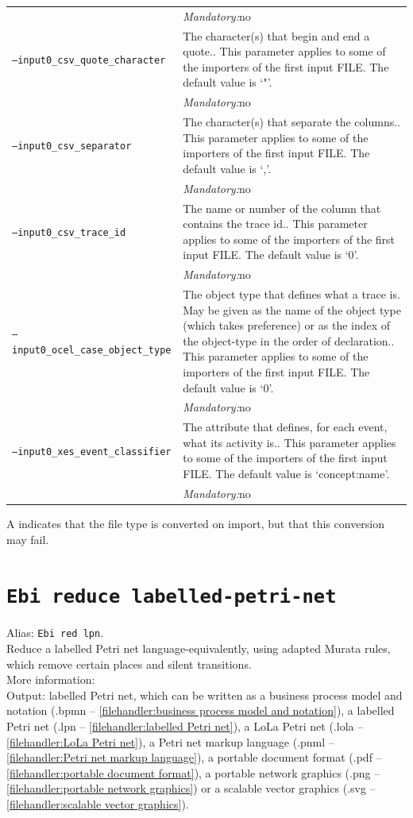 {\begin{tabularx}{\linewidth}{lX}
&\textit{Mandatory:}\quad no\\
\texttt{--input0\_csv\_quote\_character} & The character(s) that begin and end a quote.. This parameter applies to some of the importers of the first input FILE. The default value is `"'.\\
&\textit{Mandatory:}\quad no\\
\texttt{--input0\_csv\_separator} & The character(s) that separate the columns.. This parameter applies to some of the importers of the first input FILE. The default value is `,'.\\
&\textit{Mandatory:}\quad no\\
\texttt{--input0\_csv\_trace\_id} & The name or number of the column that contains the trace id.. This parameter applies to some of the importers of the first input FILE. The default value is `0'.\\
&\textit{Mandatory:}\quad no\\
\texttt{--input0\_ocel\_case\_object\_type} & The object type that defines what a trace is. May be given as the name of the object type (which takes preference) or as the index of the object-type in the order of declaration.. This parameter applies to some of the importers of the first input FILE. The default value is `0'.\\
&\textit{Mandatory:}\quad no\\
\texttt{--input0\_xes\_event\_classifier} & The attribute that defines, for each event, what its activity is.. This parameter applies to some of the importers of the first input FILE. The default value is `concept:name'.\\
&\textit{Mandatory:}\quad no\\
\bottomrule
\end{tabularx}
A \textdagger{} indicates that the file type is converted on import, but that this conversion may fail.
\clearpage\section{\texttt{Ebi reduce labelled-petri-net}}
\label{command:Ebi reduce labelled-petri-net}
Alias: \texttt{Ebi red lpn}.\\
Reduce a labelled Petri net language-equivalently, using adapted Murata rules, which remove certain places and silent transitions.\\
More information: \cite{murata1989petri}~\\
\noindent Output: labelled Petri net, which can be written as a business process model and notation (.bpmn -- \cref{filehandler:business process model and notation}), a labelled Petri net (.lpn -- \cref{filehandler:labelled Petri net}), a LoLa Petri net (.lola -- \cref{filehandler:LoLa Petri net}), a Petri net markup language (.pnml -- \cref{filehandler:Petri net markup language}), a portable document format (.pdf -- \cref{filehandler:portable document format}), a portable network graphics (.png -- \cref{filehandler:portable network graphics}) or a scalable vector graphics (.svg -- \cref{filehandler:scalable vector graphics}).\\
}
